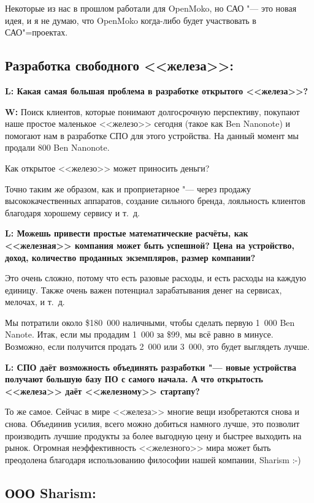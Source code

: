\documentclass[10pt, a5paper]{article}
\begin{document}
Некоторые из нас в прошлом работали для OpenMoko, но САО "--- это новая идея, и я не думаю, что OpenMoko когда-либо будет участвовать в САО"=проектах.

\subsection*{Разработка свободного <<железа>>:}

{\noindent \bf L: Какая самая большая проблема в разработке открытого <<железа>>?}

{\noindent \bf W:} Поиск клиентов, которые понимают долгосрочную перспективу, покупают наше простое маленькое <<железо>> сегодня (такое как Ben Nanonote) и помогают нам в разработке СПО для этого устройства. На данный момент мы продали 800 Ben Nanonote.

Как открытое <<железо>> может приносить деньги?

Точно таким же образом, как и проприетарное "--- через продажу высококачественных аппаратов, создание сильного бренда, лояльность клиентов благодаря хорошему сервису и т.~д.

{\noindent \bf L: Можешь привести простые математические расчёты, как <<железная>> компания может быть успешной? Цена на \linebreak устройство, доход, количество проданных экземпляров, \linebreak  размер компании?}

Это очень сложно, потому что есть разовые расходы, и есть расходы на каждую единицу. Также очень важен потенциал зарабатывания денег на сервисах, мелочах, и т.~д.

Мы потратили около \$180~000 наличными, чтобы сделать первую 1~000 Ben Nanote. Итак, если мы продадим 1~000 за \$99, мы всё равно в минусе. Возможно, если получится продать 2~000 или 3~000, это будет выглядеть лучше.

{\noindent \bf L: СПО даёт возможность объединять разработки "--- новые устройства получают большую базу ПО с самого начала. А что открытость <<железа>> даёт <<железному>> стартапу?}

То же самое. Сейчас в мире <<железа>> многие вещи изобретаются снова и снова. Объединив усилия, всего можно добиться намного лучше, это позволит производить лучшие продукты за более выгодную цену и быстрее выходить на рынок. Огромная неэффективность <<железного>> мира может быть преодолена благодаря использованию философии нашей компании, Sharism :-)

\subsection*{ООО Sharism:}
\end{document}

